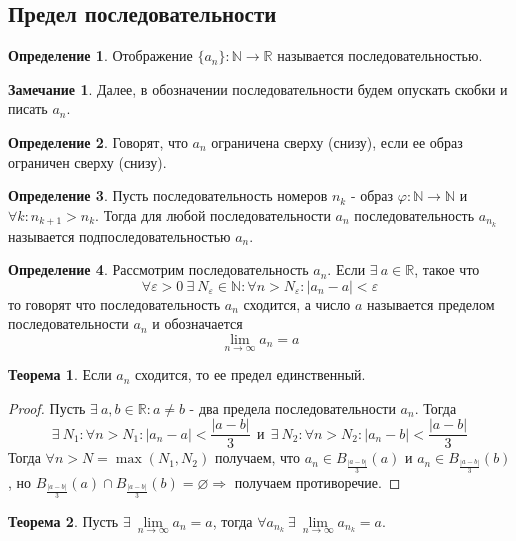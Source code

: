 \documentclass[a4paper, 12pt]{article}
\newcommand{\N}{\mathbb{N}}
\newcommand{\R}{\mathbb{R}}
\renewcommand{\phi}{\varphi}
\renewcommand{\epsilon}{\varepsilon}
\renewcommand{\emptyset}{\varnothing}
\newcommand{\lims}{\lim\limits_{n\to \infty}}
\theoremstyle{definition}
\newtheorem*{definition}{Определение}
\newtheorem*{theorem}{Теорема}
\newtheorem*{comm}{Замечание}
\begin{document}
    \subsection{Предел последовательности}
        \begin{definition}
            Отображение $\{a_n\}: \N\to \R$ называется последовательностью.
        \end{definition} 
        \begin{comm}
            Далее, в обозначении последовательности будем опускать скобки и писать $a_n$.
        \end{comm} 
        \begin{definition}
            Говорят, что $a_n$ ограничена сверху (снизу), если ее образ ограничен сверху (снизу).
        \end{definition} 
        \begin{definition}
            Пусть последовательность номеров $n_k$ - образ $\phi: \N\to \N$ и $\forall k: n_{k+1}>n_k$. Тогда для любой последовательности $a_n$ последовательность $a_{n_k}$ называется подпоследовательностью $a_n$.
        \end{definition} 
        \begin{definition}
            Рассмотрим последовательность $a_n$. Если $\exists \ a\in \R$, такое что 
            \[\forall \epsilon>0\ \exists\ N_{\epsilon}\in \N: \forall n>N_{\epsilon}: |a_n-a|<\epsilon\]
            то говорят что последовательность $a_n$ сходится, а число $a$ называется пределом последовательности $a_n$ и обозначается
            \[\lim\limits_{n\to \infty} a_n=a\]
        \end{definition}
        \begin{theorem}
            Если $a_n$ сходится, то ее предел единственный.
        \end{theorem} 
        \begin{proof}
            Пусть $\exists\ a,b\in \R: a\ne b$ - два предела последовательности $a_n$. Тогда
            \[\exists\ N_1: \forall n>N_1: |a_n-a|<\frac{|a-b|}{3}\  \ \text{и}\ \ \exists\ N_2: \forall n>N_2: |a_n-b|<\frac{|a-b|}{3}\]
            Тогда $\forall n>N = \max{(N_1, N_2)}$ получаем, что $a_n\in B_{\frac{|a-b|}{3}}(a)$ и $a_n\in B_{\frac{|a-b|}{3}}(b)$, но $B_{\frac{|a-b|}{3}}(a)\cap B_{\frac{|a-b|}{3}}(b)= \emptyset \Rightarrow$ получаем противоречие.
        \end{proof} 
        \begin{theorem}
            Пусть $\exists\ \lims a_n=a$, тогда $\forall a_{n_k}\ \exists\ \lims a_{n_k}=a$.
        \end{theorem} 
\end{document}
